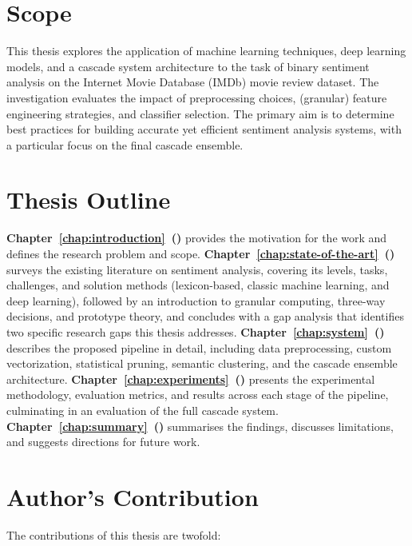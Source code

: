 \documentclass[a4paper,twoside,12pt]{book}
\begin{document}
\section{Scope}
This thesis explores the application of machine learning techniques, deep learning models, and a cascade system architecture to the task of binary sentiment analysis on the Internet Movie Database (IMDb) movie review dataset. The investigation evaluates the impact of preprocessing choices, (granular) feature engineering strategies, and classifier selection. The primary aim is to determine best practices for building accurate yet efficient sentiment analysis systems, with a particular focus on the final cascade ensemble.

\section{Thesis Outline}

\textbf{Chapter~\ref{chap:introduction}~()} provides the motivation for the work and defines the research problem and scope. \textbf{Chapter~\ref{chap:state-of-the-art}~()} surveys the existing literature on sentiment analysis, covering its levels, tasks, challenges, and solution methods (lexicon-based, classic machine learning, and deep learning), followed by an introduction to granular computing, three-way decisions, and prototype theory, and concludes with a gap analysis that identifies two specific research gaps this thesis addresses. \textbf{Chapter~\ref{chap:system}~()} describes the proposed pipeline in detail, including data preprocessing, custom vectorization, statistical pruning, semantic clustering, and the cascade ensemble architecture. \textbf{Chapter~\ref{chap:experiments}~()} presents the experimental methodology, evaluation metrics, and results across each stage of the pipeline, culminating in an evaluation of the full cascade system. \textbf{Chapter~\ref{chap:summary}~()} summarises the findings, discusses limitations, and suggests directions for future work.

\section{Author's Contribution} %

The contributions of this thesis are twofold: 
\end{document}
